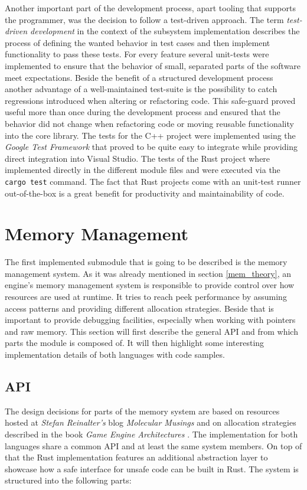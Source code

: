 Another important part of the development process, apart tooling that supports the programmer, was the decision to follow a test-driven approach. The term \textit{test-driven development} in the context of the subsystem implementation describes the process of defining the wanted behavior in test cases and then implement functionality to pass these tests. For every feature several unit-tests were implemented to ensure that the behavior of small, separated parts of the software meet expectations. Beside the benefit of a structured development process another advantage of a well-maintained test-suite is the possibility to catch regressions introduced when altering or refactoring code. This safe-guard proved useful more than once during the development process and ensured that the behavior did not change when refactoring code or moving reusable functionality into the core library. The tests for the C++ project were implemented using the \textit{Google Test Framework} that proved to be quite easy to integrate while providing direct integration into Visual Studio. The tests of the Rust project where implemented directly in the different module files and were executed via the \texttt{cargo test} command. The fact that Rust projects come with an unit-test runner out-of-the-box is a great benefit for productivity and maintainability of code. 

\section{Memory Management} \label{mem_impl}

The first implemented submodule that is going to be described is the memory management system. As it was already mentioned in section \ref{mem_theory}, an engine's memory management system is responsible to provide control over how resources are used at runtime. It tries to reach peek performance by assuming access patterns and providing different allocation strategies. Beside that is important to provide debugging facilities, especially when working with pointers and raw memory. This section will first describe the general \ac{API} and from which parts the module is composed of. It will then highlight some interesting implementation details of both languages with code samples.

\subsection{API}

The design decisions for parts of the memory system are based on resources hosted at \textit{Stefan Reinalter's} blog \textit{Molecular Musings} \cite{MOL_MS_1} \cite{MOL_MS_2} \cite{MOL_MS_3} \cite{MOL_MS_4} \cite{MOL_MS_5} and on allocation strategies described in the book \textit{Game Engine Architectures} \cite{GEA_2}. The implementation for both languages share a common \ac{API} and at least the same system members. On top of that the Rust implementation features an additional abstraction layer to showcase how a safe interface for unsafe code can be built in Rust. The system is structured into the following parts:

